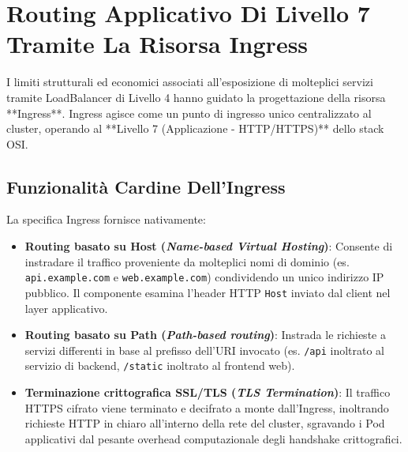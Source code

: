 \documentclass[11pt, a4paper]{article}
\begin{document}
\newpage


\section{Routing Applicativo Di Livello 7 Tramite La Risorsa Ingress}

I limiti strutturali ed economici associati all'esposizione di molteplici servizi tramite LoadBalancer di Livello 4 hanno guidato la progettazione della risorsa **Ingress**. Ingress agisce come un punto di ingresso unico centralizzato al cluster, operando al **Livello 7 (Applicazione - HTTP/HTTPS)** dello stack OSI.


\subsection{Funzionalità Cardine Dell'Ingress}
La specifica Ingress fornisce nativamente:
\begin{itemize}[noitemsep]
    \item \textbf{Routing basato su Host (\emph{Name-based Virtual Hosting})}: Consente di instradare il traffico proveniente da molteplici nomi di dominio (es. \texttt{api.example.com} e \texttt{web.example.com}) condividendo un unico indirizzo IP pubblico. Il componente esamina l'header HTTP \texttt{Host} inviato dal client nel layer applicativo.
    \item \textbf{Routing basato su Path (\emph{Path-based routing})}: Instrada le richieste a servizi differenti in base al prefisso dell'URI invocato (es. \texttt{/api} inoltrato al servizio di backend, \texttt{/static} inoltrato al frontend web).
    \item \textbf{Terminazione crittografica SSL/TLS (\emph{TLS Termination})}: Il traffico HTTPS cifrato viene terminato e decifrato a monte dall'Ingress, inoltrando richieste HTTP in chiaro all'interno della rete del cluster, sgravando i Pod applicativi dal pesante overhead computazionale degli handshake crittografici.
\end{itemize}
\end{document}
